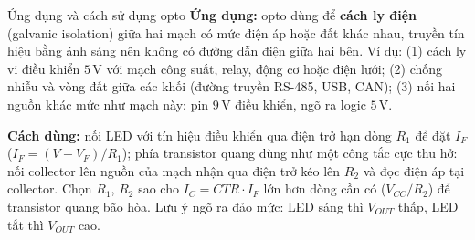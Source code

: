 \begin{notebox}{Ứng dụng và cách sử dụng opto}
\textbf{Ứng dụng:} opto dùng để \textbf{cách ly điện} (galvanic isolation) giữa hai mạch có mức điện áp hoặc đất khác nhau, truyền tín hiệu bằng ánh sáng nên không có đường dẫn điện giữa hai bên. Ví dụ: (1) cách ly vi điều khiển $5\,\text{V}$ với mạch công suất, relay, động cơ hoặc điện lưới; (2) chống nhiễu và vòng đất giữa các khối (đường truyền RS-485, USB, CAN); (3) nối hai nguồn khác mức như mạch này: pin $9\,\text{V}$ điều khiển, ngõ ra logic $5\,\text{V}$.

\textbf{Cách dùng:} nối LED với tín hiệu điều khiển qua điện trở hạn dòng $R_1$ để đặt $I_F$ ($I_F = (V - V_F)/R_1$); phía transistor quang dùng như một công tắc cực thu hở: nối collector lên nguồn của mạch nhận qua điện trở kéo lên $R_2$ và đọc điện áp tại collector. Chọn $R_1$, $R_2$ sao cho $I_C = CTR\cdot I_F$ lớn hơn dòng cần có ($V_{CC}/R_2$) để transistor quang bão hòa. Lưu ý ngõ ra đảo mức: LED sáng thì $V_{OUT}$ thấp, LED tắt thì $V_{OUT}$ cao.
\end{notebox}
